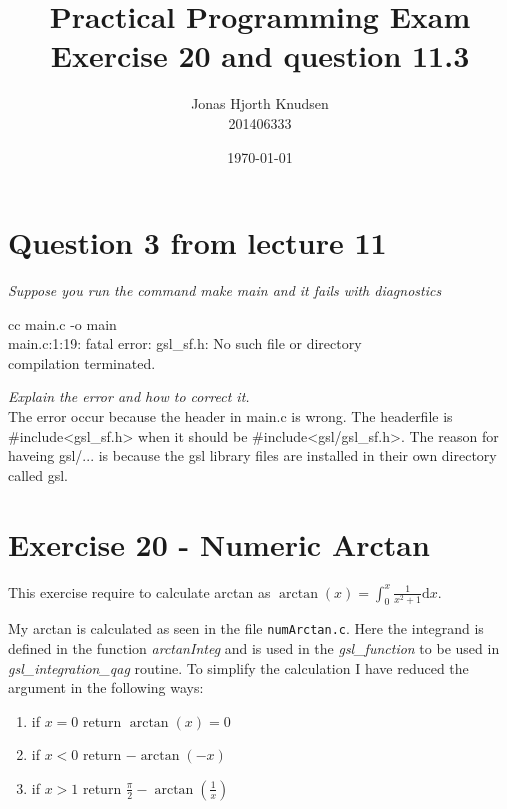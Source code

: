 \documentclass[a4paper,10pt,onecolumn]{article}
\begin{document}
\title{Practical Programming Exam\\ Exercise 20 and question 11.3}
\author{Jonas Hjorth Knudsen\\ 201406333}
\date{\today}

\maketitle



\section{Question 3 from lecture 11}

\textit{Suppose you run the command \emph{make main} and it fails with diagnostics}

\begin{framed}
cc \hspace{1cm} main.c \hspace{1cm} -o main\\
main.c:1:19: fatal error: gsl\_sf.h: No such file or directory\\
compilation terminated.
\end{framed}

\textit{Explain the error and how to correct it.}\\

The error occur because the header in main.c is wrong. The headerfile is \mbox{\#include\textless gsl\_sf.h\textgreater}
 when it should be \#include\textless gsl/gsl\_sf.h\textgreater.
The reason for haveing gsl/... is because the gsl library files are installed in their own directory called gsl.




\section{Exercise 20 - Numeric Arctan}

This exercise require to calculate arctan as $\arctan(x) = \int_0^x \frac{1}{x^2+1} \mathrm{d}x$.

My arctan is calculated as seen in the file \texttt{numArctan.c}. Here the integrand is defined in the function \emph{arctanInteg} and is used
in the \emph{gsl\_function} to be used in \emph{gsl\_integration\_qag} routine. To simplify the calculation I have reduced the argument in the following ways:

\begin{enumerate}
	\item if $x=0$ return $\operatorname{arctan}(x)=0$
	\item if $x<0$ return $-\operatorname{arctan}(-x)$
	\item if $x>1$ return $\frac{\pi}{2} - \operatorname{arctan}(\frac{1}{x})$
\end{enumerate}
\end{document}
